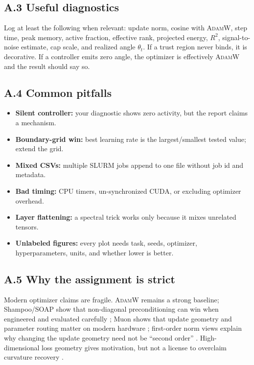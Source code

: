 \documentclass[10pt]{article}
\newcommand{\AdamW}{\textsc{AdamW}}
\begin{document}
\subsection*{A.3 Useful diagnostics}
Log at least the following when relevant: update norm, cosine with \AdamW{}, step time, peak memory, active fraction, effective rank, projected energy, $R^2$, signal-to-noise estimate, cap scale, and realized angle $\theta_t$. If a trust region never binds, it is decorative. If a controller emits zero angle, the optimizer is effectively \AdamW{} and the result should say so.

\subsection*{A.4 Common pitfalls}
\begin{itemize}
  \item \textbf{Silent controller:} your diagnostic shows zero activity, but the report claims a mechanism.
  \item \textbf{Boundary-grid win:} best learning rate is the largest/smallest tested value; extend the grid.
  \item \textbf{Mixed CSVs:} multiple SLURM jobs append to one file without job id and metadata.
  \item \textbf{Bad timing:} CPU timers, un-synchronized CUDA, or excluding optimizer overhead.
  \item \textbf{Layer flattening:} a spectral trick works only because it mixes unrelated tensors.
  \item \textbf{Unlabeled figures:} every plot needs task, seeds, optimizer, hyperparameters, units, and whether lower is better.
\end{itemize}

\subsection*{A.5 Why the assignment is strict}
Modern optimizer claims are fragile. \AdamW{} remains a strong baseline; Shampoo/SOAP show that non-diagonal preconditioning can win when engineered and evaluated carefully \citep{shampoo2018,soap2025}; Muon shows that update geometry and parameter routing matter on modern hardware \citep{muon2024,moonlight2025}; first-order norm views explain why changing the update geometry need not be ``second order'' \citep{oldnorm2024}. High-dimensional loss geometry gives motivation, but not a license to overclaim curvature recovery \citep{dauphin2014saddle,pennington2017geometry,saxe2014deeplinear,goldt2019teacherstudent}.
\end{document}
